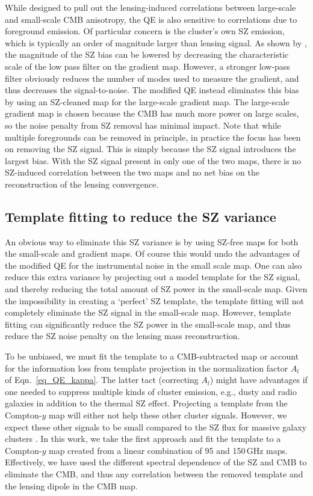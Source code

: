 While designed to pull out the lensing-induced correlations between large-scale and small-scale CMB anisotropy, the QE is also sensitive to  correlations due to foreground emission.
Of particular concern is  the cluster's own SZ emission, which is typically an order of magnitude larger than lensing signal. 
As shown by \citet{hu07}, the magnitude of the SZ bias can be lowered by decreasing the characteristic scale of the low pass filter on the gradient map. 
However, a stronger low-pass filter obviously reduces the number of modes used to measure the gradient, and thus decreases the signal-to-noise. 
The modified QE instead eliminates this bias by using an SZ-cleaned map for the large-scale gradient map. 
The large-scale gradient map is chosen because the CMB has much more power on large scales, so the noise penalty from SZ removal has minimal impact. 
Note that while multiple foregrounds can be removed in principle, in practice the focus has been on removing the SZ signal. 
This is simply because the SZ signal introduces the largest bias.  
With the SZ signal present in only one of the two maps, there is no SZ-induced correlation between the two maps and no net bias on the reconstruction of the lensing convergence. 

\subsection{Template fitting to reduce the SZ variance}
\label{sec_sz_template_fitting}

An obvious way to eliminate this SZ variance is by using SZ-free maps for both the small-scale and gradient maps. 
Of course this would undo the advantages of the modified QE for the instrumental noise in the small scale map. 
One can also reduce this extra variance by projecting out a model template for the SZ signal, and thereby reducing the total amount of SZ power in the small-scale map. 
Given the impossibility in creating a `perfect' SZ template, the template fitting will not completely eliminate the SZ signal in the small-scale map. 
However, template fitting can significantly reduce the SZ power in the small-scale map, and thus reduce the SZ noise penalty on the lensing mass reconstruction. 



To be unbiased, we must fit the template to a CMB-subtracted map or account for the information loss from template projection in the normalization factor $A_l$ of Eqn.~\ref{eq_QE_kappa}. 
The latter tact (correcting $A_l$) might have advantages if one needed to suppress multiple kinds of cluster emission, e.g., dusty and radio galaxies in addition to the thermal SZ effect. 
Projecting a template from the Compton-$y$ map will either not help these other cluster signals. 
However, we expect these other signals to be small compared to the SZ flux for massive galaxy clusters . 
In this work, we take the first approach and fit the template to a Compton-$y$ map created from a linear combination of 95 and 150\,GHz maps. 
Effectively, we have used the different spectral dependence of the SZ and CMB to eliminate the CMB, and thus any correlation between the removed template and the lensing dipole in the CMB map. 


